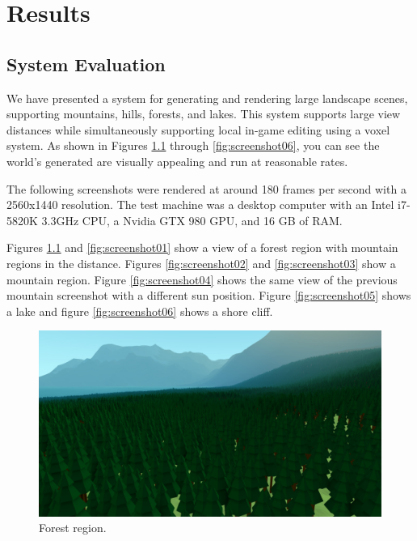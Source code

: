 
\chapter{Results} \label{results}

\section{System Evaluation}

We have presented a system for generating and rendering large landscape scenes, supporting mountains, hills, forests, and lakes.
This system supports large view distances while simultaneously supporting local in-game editing using a voxel system.
As shown in Figures \ref{fig:screenshot00} through \ref{fig:screenshot06}, you can see the world’s generated are visually appealing and run at reasonable rates.

The following screenshots were rendered at around 180 frames per second with a 2560x1440 resolution.
The test machine was a desktop computer with an Intel i7-5820K 3.3GHz CPU, a Nvidia GTX 980 GPU, and 16 GB of RAM.

Figures \ref{fig:screenshot00} and \ref{fig:screenshot01} show a view of a forest region with mountain regions in the distance.
Figures \ref{fig:screenshot02} and \ref{fig:screenshot03} show a mountain region.
Figure \ref{fig:screenshot04} shows the same view of the previous mountain screenshot with a different sun position.
Figure \ref{fig:screenshot05} shows a lake and figure \ref{fig:screenshot06} shows a shore cliff.

\begin{figure}
	\centering
		\includegraphics[width=1.0\textwidth]{figures/Screenshot000000.jpg}
	\caption{Forest region.}
	\label{fig:screenshot00}
\end{figure}

